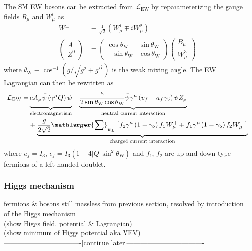 \documentclass[../thesis.tex]{subfiles}
\begin{document}
The \acs{SM} \acs{EW} bosons can be extracted from $\mathcal{L}_\text{EW}$ by reparameterizing the gauge fields $B_\mu$ and $W_\mu^i$ as
\begin{align}
W^\pm &\equiv \frac{1}{\sqrt{2}}\left(W^1_\mu \mp iW^2_\mu\right) \\ 
\begin{pmatrix}
A \\ Z^0
\end{pmatrix}
&\equiv \begin{pmatrix}
\cos \theta_\text{W} & \sin \theta_\text{W} \\
-\sin \theta_\text{W} & \cos \theta_\text{W}
\end{pmatrix}
\begin{pmatrix}
B_\mu \\ W_\mu^3
\end{pmatrix}
\end{align}
where $\theta_\text{W}\equiv\cos^{-1}\left(g/\sqrt{g^2+g'^2}\right)$ is the weak mixing angle. The \acs{EW} Lagrangian can then be rewritten as
\begin{equation}
\begin{aligned}
\mathcal{L}_\text{EW} =&
\underbrace{\vphantom{\displaystyle\frac{e}{2\sin\theta_\text{W}}}
eA_\mu\bar{\psi}\left(\gamma^\mu Q\right)\psi
}_\text{electromagnetism}
+\underbrace{
\displaystyle\frac{e}{2\sin\theta_\text{W}\cos\theta_\text{W}}\bar{\psi}\gamma^\mu\left(v_f-a_f\gamma_5 \right)\psi Z_\mu
}_\text{neutral current interaction} \\
&+\underbrace{
\displaystyle\frac{g}{2\sqrt{2}}\mathlarger{\sum}_{\psi_L}
\left[ \bar{f}_2\gamma^\mu\left(1-\gamma_5\right)f_1 W_\mu^+ + \bar{f}_1\gamma^\mu\left(1-\gamma_5\right)f_2 W_\mu^- \right]
}_\text{charged current interaction}
\end{aligned}
\end{equation}
where $a_f=I_3$, $v_f=I_3(1-4|Q|\sin^2\theta_\text{W})$ and $f_1$, $f_2$ are up and down type fermions of a left-handed doublet.


\subsubsection*{Higgs mechanism}
fermions \& bosons still massless from previous section, resolved by introduction of the Higgs mechanism\\
(show Higgs field, potential \& Lagrangian)\\
(show minimum of Higgs potential aka VEV)\\
----------------------------------[continue later]----------------------------------
\end{document}
